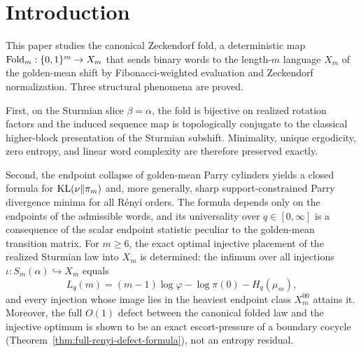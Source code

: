 \section{Introduction}\label{sec:introduction}

This paper studies the canonical Zeckendorf fold, a deterministic map
$\mathrm{Fold}_m:\{0,1\}^m\to X_m$ that sends binary words to the length-$m$
language $X_m$ of the golden-mean shift by Fibonacci-weighted evaluation and
Zeckendorf normalization. Three structural phenomena are proved.

First, on the Sturmian slice $\beta=\alpha$, the fold is bijective on
realized rotation factors and the induced sequence map is topologically
conjugate to the classical higher-block presentation of the Sturmian
subshift. Minimality, unique ergodicity, zero entropy, and linear word
complexity are therefore preserved exactly.

Second, the endpoint collapse of golden-mean Parry cylinders yields a closed
formula for $\operatorname{KL}(\nu\|\pi_m)$ and, more generally, sharp
support-constrained Parry divergence minima for all R\'enyi orders. The
formula depends only on the endpoints of the admissible words, and its
universality over $q\in[0,\infty]$ is a consequence of the scalar
endpoint statistic peculiar to the golden-mean transition matrix. For
$m\ge 6$, the exact optimal injective placement of the realized Sturmian
law into $X_m$ is determined: the infimum over all injections
$\iota:S_m(\alpha)\hookrightarrow X_m$ equals
\[
L_q(m)=(m-1)\log\varphi-\log\pi(0)-H_q(\mu_m),
\]
and every injection whose image lies in the heaviest endpoint class
$X_m^{00}$ attains it. Moreover, the full $O(1)$ defect between the
canonical folded law and the injective optimum is shown to be an exact
escort-pressure of a boundary cocycle
(Theorem~\ref{thm:full-renyi-defect-formula}), not an entropy residual.

